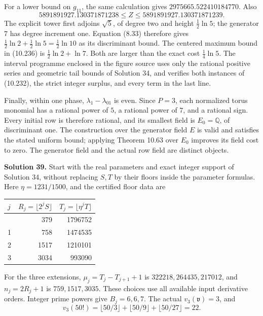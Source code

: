 \documentclass[
  11pt,
  a4paper,
]{article}
\newcounter{none} %
\begin{document}
For a lower bound on \(g_{11}\), the same calculation gives
\(2975665.522410184770\). Also \[
5891891927.130371871238\le Z\le
5891891927.130371871239.
\] The explicit tower first adjoins \(\sqrt5\), of degree two and height
\(\frac12\ln5\); the generator \(7\) has degree increment one. Equation
(8.33) therefore gives \(\frac12\ln2+\frac12\ln5=\frac12\ln10\) as its
discriminant bound. The centered maximum bound in (10.236) is
\(\frac12\ln2+\ln7\). Both are larger than the exact cost
\(\frac14\ln5\). The interval programme enclosed in the figure source
uses only the rational positive series and geometric tail bounds of
Solution 34, and verifies both instances of (10.232), the strict integer
surplus, and every term in the last line.

Finally, within one phase, \(\lambda_1-\lambda_{01}\) is even. Since
\(P=3\), each normalized torus monomial has a rational power of \(5\), a
rational power of \(7\), and a rational sign. Every initial row is
therefore rational, and its smallest field is \(E_0=\mathbb Q\), of
discriminant one. The construction over the generator field \(E\) is
valid and satisfies the stated uniform bound; applying Theorem 10.63
over \(E_0\) improves its field cost to zero. The generator field and
the actual row field are distinct objects.

\textbf{Solution 39.} Start with the real parameters and exact integer
support of Solution 34, without replacing \(S,T\) by their floors inside
the parameter formulas. Here \(\eta=1231/1500\), and the certified floor
data are

{\def\LTcaptype{none} %
\begin{longtable}[]{@{}lrr@{}}
\toprule\noalign{}
\(j\) & \(R_j=\lfloor2^jS\rfloor\) & \(T_j=\lfloor\eta^jT\rfloor\) \\
\midrule\noalign{}
\endhead
\bottomrule\noalign{}
\endlastfoot
0 & 379 & 1796752 \\
1 & 758 & 1474535 \\
2 & 1517 & 1210101 \\
3 & 3034 & 993090 \\
\end{longtable}
}

For the three extensions, \(\mu_j=T_j-T_{j+1}+1\) is
\(322218,264435,217012\), and \(n_j=2R_j+1\) is \(759,1517,3035\). These
choices use all available input derivative orders. Integer prime powers
give \(B_j=6,6,7\). The actual \(v_3(\mathfrak v)=3\), and \[
v_3(50!)=\lfloor50/3\rfloor+\lfloor50/9\rfloor+\lfloor50/27\rfloor=22.
\]
\end{document}
